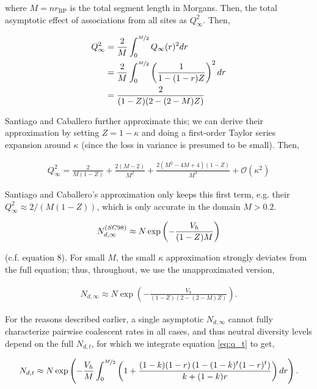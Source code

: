 \documentclass[11pt]{article}
\begin{document}
where $M = n r_\text{BP}$ is the total segment length in Morgans. Then, the
total asymptotic effect of associations from all sites as $Q_\infty^2$.  Then,

\begin{align}
  Q_\infty^2 &= \frac{2}{M}\int_0^{\nicefrac{M}{2}} Q_{\infty}(r)^2 dr  \\
  &=  \frac{2}{M} \int_0^{\nicefrac{M}{2}} \left(\frac{1}{1 - (1-r)Z}\right)^2 dr  \\
  &= \frac{2}{(1-Z) (2-(2-M) Z)}
\end{align}

Santiago and Caballero further approximate this; we can derive their
approximation by setting $Z = 1-\kappa$ and doing a first-order Taylor series
expansion around $\kappa$ (since the loss in variance is presumed to be small).
Then,

\begin{align}
  Q_\infty^2 = \frac{2}{M (1-Z)} + \frac{2 (M-2)}{M^2}+\frac{2 \left(M^2-4 M+4\right) (1-Z)}{M^3} + \mathcal{O}(\kappa^2)
\end{align}

Santiago and Caballero's approximation only keeps this first term, e.g. their
$Q_\infty^2 \approx 2/(M(1-Z))$, which is only accurate in the domain $M >
0.2$. 

\begin{align}
  N_{d,\infty}^{\text(SC98)} \approx N \exp\left(-\frac{V_h}{(1-Z)M}\right) 
\end{align}

(c.f. \cite{Santiago1998-bs} equation 8). For small $M$, the small $\kappa$
approximation strongly deviates from the full equation; thus, throughout, we
use the unapproximated version,

\begin{align}
  \label{eq:Ne_inf}
  N_{d,\infty} \approx N \exp\left(-\frac{V_h}{(1-Z) (2-(2-M) Z)} \right).
\end{align}

For the reasons described earlier, a single asymptotic $N_{d,\infty}$ cannot
fully characterize pairwise coalescent rates in all cases, and thus neutral
diversity levels depend on the full $N_{d,t}$, for which we integrate equation
\eqref{eq:q_t} to get,

\begin{align}
  \label{eq:net_integral}
  N_{d,t} \approx N \exp\left(-\frac{V_h}{M} \int_0^{\nicefrac{M}{2}} \left(1+\frac{(1-k) (1-r) \left(1-(1-k)^t (1-r)^t\right)}{k+(1-k)r} \right) dr \right).
\end{align}
\end{document}
